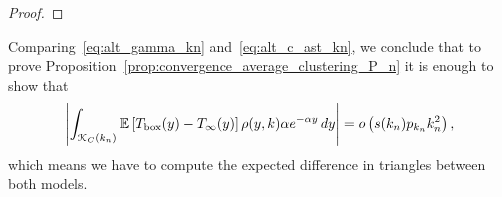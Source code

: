 \begin{proof}
\end{proof}


%
%

Comparing~\eqref{eq:alt_gamma_kn} and~\eqref{eq:alt_c_ast_kn}, we conclude that to prove Proposition~\ref{prop:convergence_average_clustering_P_n} it is enough to show that
\begin{equation}\label{eq:triangle_diff_main_term}
	 \left|\int_{{\mathcal K}_{C}(k_n)} \mathbb{E}\left[T_{\text{box}}(y) - T_\infty(y)\right]
	\rho(y,k) \alpha e^{-\alpha y} \, d y \right|
	= o\left(s(k_n)p_{k_n}k_n^2\right),
\end{equation}
which means we have to compute the expected difference in triangles between both models.


